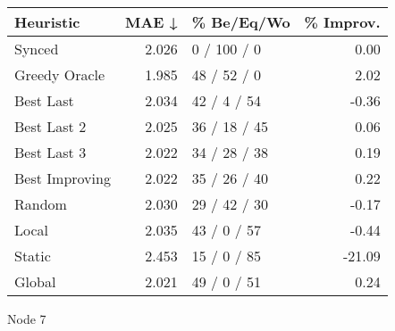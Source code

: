\begin{tabular}{lrlr}
\toprule
\textbf{Heuristic} & \textbf{MAE ↓} & \textbf{\% Be/Eq/Wo} & \textbf{\% Improv.} \\
\midrule
            Synced &          2.026 &          0 / 100 / 0 &                0.00 \\
     Greedy Oracle &          1.985 &          48 / 52 / 0 &                2.02 \\
         Best Last &          2.034 &          42 / 4 / 54 &               -0.36 \\
       Best Last 2 &          2.025 &         36 / 18 / 45 &                0.06 \\
       Best Last 3 &          2.022 &         34 / 28 / 38 &                0.19 \\
    Best Improving &          2.022 &         35 / 26 / 40 &                0.22 \\
            Random &          2.030 &         29 / 42 / 30 &               -0.17 \\
             Local &          2.035 &          43 / 0 / 57 &               -0.44 \\
            Static &          2.453 &          15 / 0 / 85 &              -21.09 \\
            Global &          2.021 &          49 / 0 / 51 &                0.24 \\
\bottomrule
\end{tabular}
\caption{Node 7}
\label{tab:hr_non_lr01_le2_bs4_7}
